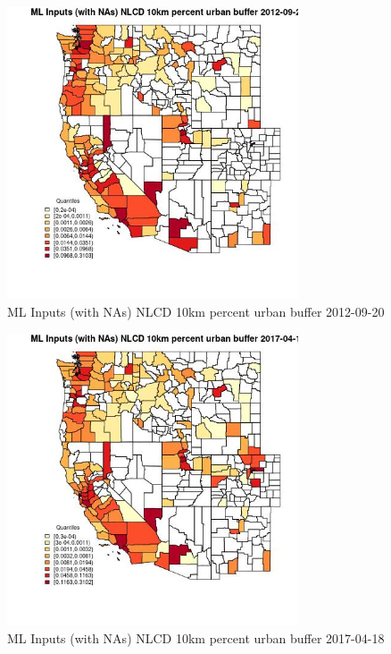 \begin{figure} 
\centering  
\includegraphics[width=0.77\textwidth]{Code_Outputs/Report_ML_input_PM25_Step4_part_e_de_duplicated_aves_compiled_2019-05-14wNAs_CountyNLCD_10km_percent_urban_bufferMean2012-09-20_2012-09-20.jpg} 
\caption{\label{fig:Report_ML_input_PM25_Step4_part_e_de_duplicated_aves_compiled_2019-05-14wNAsCountyNLCD_10km_percent_urban_bufferMean2012-09-20_2012-09-20}ML Inputs (with NAs) NLCD 10km percent urban buffer 2012-09-20} 
\end{figure} 
 

\begin{figure} 
\centering  
\includegraphics[width=0.77\textwidth]{Code_Outputs/Report_ML_input_PM25_Step4_part_e_de_duplicated_aves_compiled_2019-05-14wNAs_CountyNLCD_10km_percent_urban_bufferMean2017-04-18_2017-04-18.jpg} 
\caption{\label{fig:Report_ML_input_PM25_Step4_part_e_de_duplicated_aves_compiled_2019-05-14wNAsCountyNLCD_10km_percent_urban_bufferMean2017-04-18_2017-04-18}ML Inputs (with NAs) NLCD 10km percent urban buffer 2017-04-18} 
\end{figure} 
 


